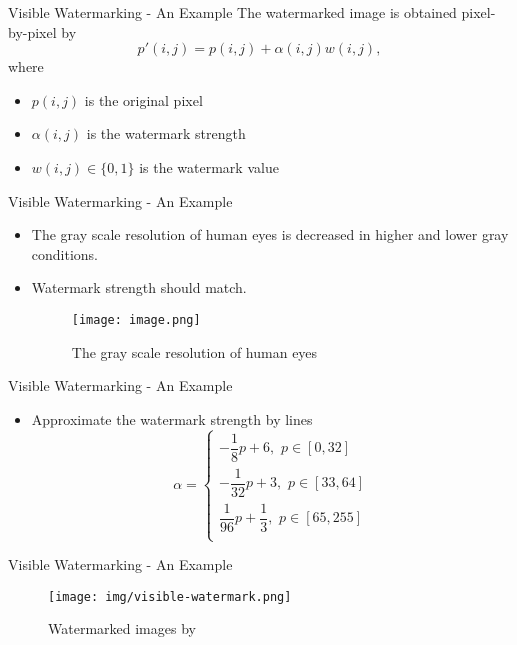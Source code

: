 \begin{frame}{Visible Watermarking - An Example}
    The watermarked image is obtained pixel-by-pixel by
    $$p'(i,j)=p(i,j)+\alpha
    (i,j)w(i,j),$$
    where
    \begin{itemize}
        \item $p(i,j)$ is the original pixel
        \item $\alpha(i,j)$ is the watermark strength
        \item $w(i,j)\in\{0,1\}$ is the watermark value
    \end{itemize}
\end{frame}

\begin{frame}{Visible Watermarking - An Example}
    \begin{itemize}
        \item The gray scale resolution of human
eyes is decreased in higher and lower gray conditions.
        \item Watermark strength should match.

        \begin{figure}
            \centering
            \texttt{[image: image.png]}
            \caption{The gray scale resolution of human eyes}
            \label{fig:enter-label}
        \end{figure}
    \end{itemize}
\end{frame}

\begin{frame}{Visible Watermarking - An Example}
    \begin{itemize}
        \item Approximate the watermark strength by lines \cite{yu2013new}
        $$\alpha = \left\{\begin{array}{l}      -\dfrac{1}{8}p+6,\,\,p\in[0,32]\\
   -\dfrac{1}{32}p+3,\,\,p\in[33,64]\\
   \dfrac{1}{96}p+\dfrac{1}{3},\,\,p\in[65,255]\\\end{array}\right.$$

    \end{itemize}
\end{frame}


\begin{frame}{Visible Watermarking - An Example}
    \begin{figure}
        \centering
        \texttt{[image: img/visible-watermark.png]}
        \caption{Watermarked images by \cite{yu2013new}}
        \label{fig:enter-label}
    \end{figure}
\end{frame}


